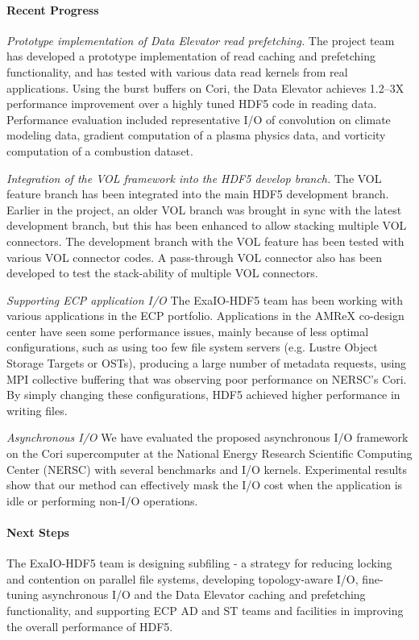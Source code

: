 \paragraph{Recent Progress}
\emph{Prototype implementation of Data Elevator read prefetching.} The project team has developed a prototype implementation of read caching and prefetching functionality, and has tested with various data read kernels from real applications. Using the burst buffers on Cori, the Data Elevator achieves 1.2--3X performance improvement over a highly tuned HDF5 code in reading data. Performance evaluation included representative I/O of convolution on climate modeling data, gradient computation of a plasma physics data, and vorticity computation of a combustion dataset. 

\emph{Integration of the VOL framework into the HDF5 develop branch. } The VOL feature branch has been integrated into the main HDF5 development branch. Earlier in the project, an older VOL branch was brought in sync with the latest development branch, but this has been enhanced to allow stacking multiple VOL connectors. The development branch with the VOL feature has been tested with various VOL connector codes. A pass-through VOL connector also has been developed to test the stack-ability of multiple VOL connectors. 

\emph{Supporting ECP application I/O}
The ExaIO-HDF5 team has been working with various applications in the ECP portfolio. Applications in the AMReX co-design center have seen some performance issues, mainly because of less optimal configurations, such as using too few file system servers (e.g. Lustre Object Storage Targets or OSTs), producing a large number of metadata requests, using MPI collective buffering that was observing poor performance on NERSC's Cori. By simply changing these configurations, HDF5 achieved higher performance in writing files. 

\emph{Asynchronous I/O}
We have evaluated the proposed asynchronous I/O framework on the Cori supercomputer at the National Energy Research Scientific Computing Center (NERSC) with several benchmarks and I/O kernels. Experimental results show that our method can effectively mask the I/O cost when the application is idle or performing non-I/O operations. 

\paragraph{Next Steps}

The ExaIO-HDF5 team is designing subfiling - a strategy for reducing locking and contention on parallel file systems, developing topology-aware I/O, fine-tuning asynchronous I/O and the Data Elevator caching and prefetching functionality, and supporting ECP AD and ST teams and facilities in improving the overall performance of HDF5.
